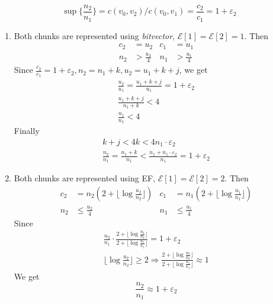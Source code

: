 \documentclass[runningheads,a4paper]{llncs}
\begin{document}
\begin{equation}
	\sup\{\frac{n_2}{n_{1}}\} = {c\left(v_{0},v_{2}\right)}/{c\left(v_{0},v_{1}\right)}=\frac{c_2}{c_1}=1+\varepsilon_{2}
\end{equation}

\begin{enumerate}
	
\item \label{itm: rb2rb}
Both chunks are represented using \textit{bitvector}, $ \mathcal{E}[1] = \mathcal{E}[2] = 1 $. Then
\begin{align*}
	c_2 & = u_2 & c_1 & = u_1 \\ 
	n_2 & > \frac{u_2}{4} &	n_1 & > \frac{u_1}{4}
\end{align*}
Since $ \frac{c_2}{c_1}=1+\varepsilon_2, n_2 = n_1 + k, u_2 = u_1 + k + j  $, we get
\begin{gather*}
	\frac{u_2}{u_1} = \frac{u_1+k+j}{u_1}=1+\varepsilon_2\\
	\frac{u_1+k+j}{n_1+k} < 4\\
	\frac{u_1}{n_1} < 4
\end{gather*}
Finally
\begin{gather*}
k+j<4k<4n_1\cdot \varepsilon_2 \\
\frac{n_2}{n_1}=\frac{n_1+k}{n_1} < \frac{n_1+ n_1\cdot \varepsilon_2}{n_1}=1+\varepsilon_2
\end{gather*}

\item \label{itm: ef2ef}
Both chunks are represented using EF, $ \mathcal{E}[1] = \mathcal{E}[2] = 2 $. Then
\begin{align*}
c_2 & = n_2(2+\lfloor \log \frac{u_2}{n_2} \rfloor) & c_1 & = n_1(2+\lfloor \log \frac{u_1}{n_1} \rfloor) \\ 
n_2 & \leq \frac{u_2}{4} &	n_1 & \leq \frac{u_1}{4}
\end{align*}
Since
\begin{gather*}
	\frac{n_2}{n_1} \cdot \frac{2+\lfloor \log \frac{u_2}{n_2} \rfloor}{2+\lfloor \log \frac{u_1}{n_1} \rfloor} = 1 + \varepsilon_2 \\ 
	\lfloor \log \frac{u_2}{n_2} \rfloor \geq 2 \Rightarrow \frac{2+\lfloor \log \frac{u_2}{n_2} \rfloor}{2+\lfloor \log \frac{u_1}{n_1} \rfloor} \approx 1
\end{gather*}
We get 
\[
 \frac{n_2}{n_1} \approx 1+ \varepsilon_2 
\]


\end{enumerate}
\end{document}
